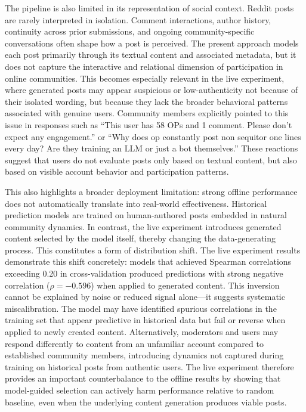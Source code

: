 The pipeline is also limited in its representation of social context. Reddit posts are rarely interpreted in isolation. Comment interactions, author history, continuity across prior submissions, and ongoing community-specific conversations often shape how a post is perceived. The present approach models each post primarily through its textual content and associated metadata, but it does not capture the interactive and relational dimension of participation in online communities. This becomes especially relevant in the live experiment, where generated posts may appear suspicious or low-authenticity not because of their isolated wording, but because they lack the broader behavioral patterns associated with genuine users. Community members explicitly pointed to this issue in responses such as ``This user has 58 OPs and 1 comment. Please don't expect any engagement.'' or ``Why does op constantly post non sequitor one lines every day? Are they training an LLM or just a bot themselves.'' These reactions suggest that users do not evaluate posts only based on textual content, but also based on visible account behavior and participation patterns.

This also highlights a broader deployment limitation: strong offline performance does not automatically translate into real-world effectiveness. Historical prediction models are trained on human-authored posts embedded in natural community dynamics. In contrast, the live experiment introduces generated content selected by the model itself, thereby changing the data-generating process. This constitutes a form of distribution shift. The live experiment results demonstrate this shift concretely: models that achieved Spearman correlations exceeding 0.20 in cross-validation produced predictions with strong negative correlation ($\rho = -0.596$) when applied to generated content. This inversion cannot be explained by noise or reduced signal alone—it suggests systematic miscalibration. The model may have identified spurious correlations in the training set that appear predictive in historical data but fail or reverse when applied to newly created content. Alternatively, moderators and users may respond differently to content from an unfamiliar account compared to established community members, introducing dynamics not captured during training on historical posts from authentic users. The live experiment therefore provides an important counterbalance to the offline results by showing that model-guided selection can actively harm performance relative to random baseline, even when the underlying content generation produces viable posts.

